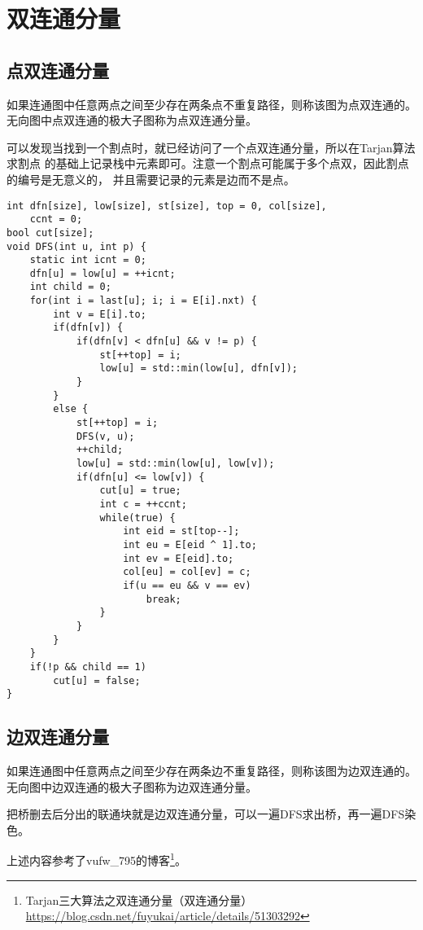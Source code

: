\section{双连通分量}
\subsection{点双连通分量}
如果连通图中任意两点之间至少存在两条点不重复路径，则称该图为点双连通的。
无向图中点双连通的极大子图称为点双连通分量。

可以发现当找到一个割点时，就已经访问了一个点双连通分量，所以在Tarjan算法求割点
的基础上记录栈中元素即可。注意一个割点可能属于多个点双，因此割点的编号是无意义的，
并且需要记录的元素是边而不是点。

\begin{lstlisting}
int dfn[size], low[size], st[size], top = 0, col[size],
    ccnt = 0;
bool cut[size];
void DFS(int u, int p) {
    static int icnt = 0;
    dfn[u] = low[u] = ++icnt;
    int child = 0;
    for(int i = last[u]; i; i = E[i].nxt) {
        int v = E[i].to;
        if(dfn[v]) {
            if(dfn[v] < dfn[u] && v != p) {
                st[++top] = i;
                low[u] = std::min(low[u], dfn[v]);
            }
        }
        else {
            st[++top] = i;
            DFS(v, u);
            ++child;
            low[u] = std::min(low[u], low[v]);
            if(dfn[u] <= low[v]) {
                cut[u] = true;
                int c = ++ccnt;
                while(true) {
                    int eid = st[top--];
                    int eu = E[eid ^ 1].to;
                    int ev = E[eid].to;
                    col[eu] = col[ev] = c;
                    if(u == eu && v == ev)
                        break;
                }
            }
        }
    }
    if(!p && child == 1)
        cut[u] = false;
}
\end{lstlisting}

\subsection{边双连通分量}
如果连通图中任意两点之间至少存在两条边不重复路径，则称该图为边双连通的。
无向图中边双连通的极大子图称为边双连通分量。

把桥删去后分出的联通块就是边双连通分量，可以一遍DFS求出桥，再一遍DFS染色。

上述内容参考了vufw\_795的博客\footnote{
    Tarjan三大算法之双连通分量（双连通分量）
\url{https://blog.csdn.net/fuyukai/article/details/51303292}
}。
